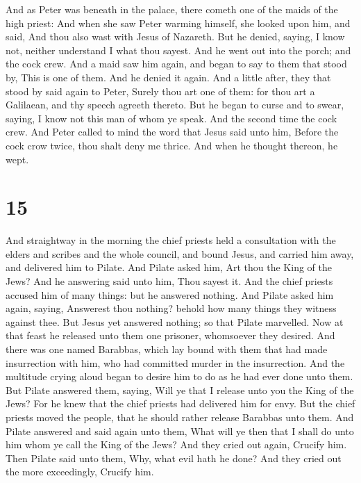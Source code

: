  And as Peter was beneath in the palace, there cometh one
of the maids of the high priest:  And when she saw Peter
warming himself, she looked upon him, and said, And thou also wast with
Jesus of Nazareth.  But he denied, saying, I know not,
neither understand I what thou sayest. And he went out into the porch;
and the cock crew.  And a maid saw him again, and began
to say to them that stood by, This is one of them.  And
he denied it again. And a little after, they that stood by said again to
Peter, Surely thou art one of them: for thou art a Galilaean, and thy
speech agreeth thereto.  But he began to curse and to
swear, saying, I know not this man of whom ye speak.  And
the second time the cock crew. And Peter called to mind the word that
Jesus said unto him, Before the cock crow twice, thou shalt deny me
thrice. And when he thought thereon, he wept.

\hypertarget{section-14}{%
\section{15}\label{section-14}}

 And straightway in the morning the chief priests held a
consultation with the elders and scribes and the whole council, and
bound Jesus, and carried him away, and delivered him to Pilate.
 And Pilate asked him, Art thou the King of the Jews? And
he answering said unto him, Thou sayest it.  And the chief
priests accused him of many things: but he answered nothing.
 And Pilate asked him again, saying, Answerest thou
nothing? behold how many things they witness against thee.
 But Jesus yet answered nothing; so that Pilate marvelled.
 Now at that feast he released unto them one prisoner,
whomsoever they desired.  And there was one named
Barabbas, which lay bound with them that had made insurrection with him,
who had committed murder in the insurrection.  And the
multitude crying aloud began to desire him to do as he had ever done
unto them.  But Pilate answered them, saying, Will ye that
I release unto you the King of the Jews?  For he knew
that the chief priests had delivered him for envy.  But
the chief priests moved the people, that he should rather release
Barabbas unto them.  And Pilate answered and said again
unto them, What will ye then that I shall do unto him whom ye call the
King of the Jews?  And they cried out again, Crucify him.
 Then Pilate said unto them, Why, what evil hath he done?
And they cried out the more exceedingly, Crucify him.

